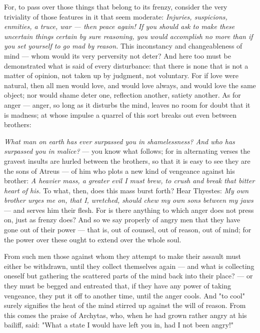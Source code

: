 For, to pass over those things that belong to its frenzy, consider the very triviality of those features in it that seem moderate: \textit{Injuries, suspicions, enmities, a truce, war — then peace again! If you should ask to make these uncertain things certain by sure reasoning, you would accomplish no more than if you set yourself to go mad by reason.} This inconstancy and changeableness of mind — whom would its very perversity not deter? And here too must be demonstrated what is said of every disturbance: that there is none that is not a matter of opinion, not taken up by judgment, not voluntary. For if love were natural, then all men would love, and would love always, and would love the same object; nor would shame deter one, reflection another, satiety another. As for anger — anger, so long as it disturbs the mind, leaves no room for doubt that it is madness; at whose impulse a quarrel of this sort breaks out even between brothers:

 \textit{What man on earth has ever surpassed you in shamelessness? And who has surpassed you in malice?} — you know what follows; for in alternating verses the gravest insults are hurled between the brothers, so that it is easy to see they are the sons of Atreus — of him who plots a new kind of vengeance against his brother: \textit{A heavier mass, a greater evil I must brew, to crush and break that bitter heart of his.} To what, then, does this mass burst forth? Hear Thyestes: \textit{My own brother urges me on, that I, wretched, should chew my own sons between my jaws} — and serves him their flesh. For is there anything to which anger does not press on, just as frenzy does? And so we say properly of angry men that they have gone out of their power — that is, out of counsel, out of reason, out of mind; for the power over these ought to extend over the whole soul.

 From such men those against whom they attempt to make their assault must either be withdrawn, until they collect themselves again — and what is collecting oneself but gathering the scattered parts of the mind back into their place? — or they must be begged and entreated that, if they have any power of taking vengeance, they put it off to another time, until the anger cools. And "to cool" surely signifies the heat of the mind stirred up against the will of reason. From this comes the praise of Archytas, who, when he had grown rather angry at his bailiff, said: "What a state I would have left you in, had I not been angry!"

